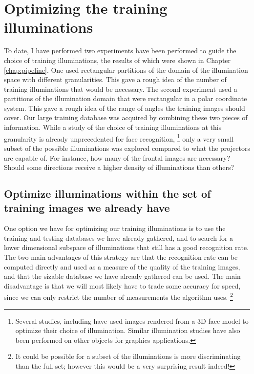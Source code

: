 \section{Optimizing the training illuminations} 
To date, I have performed two experiments have been performed to guide the
choice of training illuminations, the results of which were shown in Chapter
\ref{chap:pipeline}.  One used rectangular partitions of the domain of the
illumination space with different granularities.  This gave a rough idea of the
number of training illuminations that would be necessary.  The second
experiment used a partitions of the illumination domain that were rectangular
in a polar coordinate system.  This gave a rough idea of the range of angles
the training images should cover.  Our large training database was acquired by
combining these two pieces of information.  While a study of the choice of
training illuminations at this granularity is already unprecedented for face
recognition, \footnote{ Several studies, including \cite{Basri2003-PAMI,
LeeK2005-PAMI} have used images rendered from a 3D face model to optimize their
choice of illumination.  Similar illumination studies have also been performed
on other objects for graphics applications.} only a very small subset of the
possible illuminations was explored compared to what the projectors are capable
of.  For instance, how many of the frontal images are necessary?  Should some
directions receive a higher density of illuminations than others? 

\subsection{Optimize illuminations within the set of training images we already have}
One option we have for optimizing our training illuminations is to use the
training and testing databases we have already gathered, and to search for a
lower dimensional subspace of illuminations that still has a good recognition
rate.  The two main advantages of this strategy are that the recognition rate
can be computed directly and used as a measure of the quality of the training
images, and that the sizable database we have already gathered can be used.
The main disadvantage is that we will most likely have to trade some accuracy
for speed, since we can only restrict the number of measurements the algorithm
uses. \footnote{It could be possible for a subset of the illuminations is more
discriminating than the full set; however this would be a very surprising
result indeed!}

